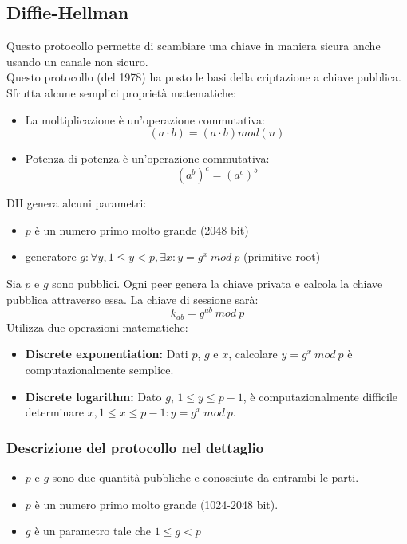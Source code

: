 \documentclass[a4paper,12pt]{article}
\begin{document}
\subsection{Diffie-Hellman}
Questo protocollo permette di scambiare una chiave in maniera sicura anche usando un canale non sicuro. \\ 
Questo protocollo (del 1978) ha posto le basi della criptazione a chiave pubblica. 
Sfrutta alcune semplici proprietà matematiche:
\begin{itemize}
	\item La moltiplicazione è un'operazione commutativa:
	$$(a \cdot b) = (a \cdot b) mod(n)$$
	\item Potenza di potenza è un'operazione commutativa:
	$$(a^b)^c = (a^c)^b$$
\end{itemize}
DH genera alcuni parametri:
\begin{itemize}
	\item $p$ è un numero primo molto grande (2048 bit)
	\item generatore $g : \forall y, 1 \leq y < p, \exists x : y = g^x\ mod\ p$ (primitive root)
\end{itemize}
Sia $p$ e $g$ sono pubblici. Ogni peer genera la chiave privata e calcola la chiave pubblica attraverso essa. La chiave di sessione sarà:
$$ k_{ab} = g^{ab}\ mod\ p $$
Utilizza due operazioni matematiche:
\begin{itemize}
	\item \textbf{Discrete exponentiation:} Dati $p$, $g$ e $x$, calcolare $y = g^x\ mod\ p$ è computazionalmente semplice.
	\item \textbf{Discrete logarithm:} Dato $g$, $1 \leq y \leq p-1$, è computazionalmente difficile determinare  $x, 1 \leq x \leq p-1 : y = g^x\ mod\ p$.
\end{itemize}

\subsubsection{Descrizione del protocollo nel dettaglio}
\begin{itemize}
	\item $p$ e $g$ sono due quantità pubbliche e conosciute da entrambi le parti.
	\item $p$ è un numero primo molto grande (1024-2048 bit).
	\item $g$ è un parametro tale che $1 \leq g < p$
\end{itemize}
\end{document}
